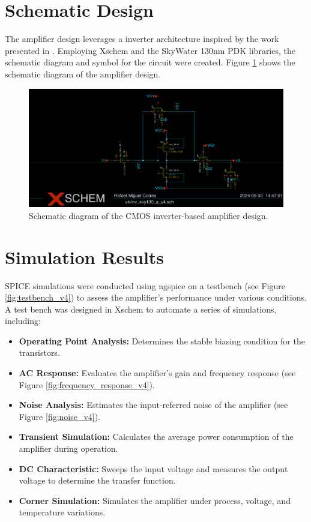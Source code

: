 \section{Schematic Design}
The amplifier design leverages a inverter architecture inspired by the work presented in \textcite{Yuan_Hierlemann_Frey_2021}.
Employing Xschem and the SkyWater 130nm PDK libraries, the schematic diagram and symbol for the circuit were created. 
Figure \ref{fig:schematic_v4} shows the schematic diagram of the amplifier design.

\begin{figure}[ht!]
\centering
\includegraphics[width=\textwidth]{Figures/v4_schematic.png}
\caption{Schematic diagram of the CMOS inverter-based amplifier design.}
\label{fig:schematic_v4}
\end{figure}

\section{Simulation Results}

SPICE simulations were conducted using ngspice on a testbench (see Figure \ref{fig:testbench_v4}) to assess the amplifier's performance under various conditions. 
A test bench was designed in Xschem to automate a series of simulations, including:

\begin{itemize}
\item \textbf{Operating Point Analysis:} Determines the stable biasing condition for the transistors.
\item \textbf{AC Response:} Evaluates the amplifier's gain and frequency response (see Figure \ref{fig:frequency_response_v4}).
\item \textbf{Noise Analysis:} Estimates the input-referred noise of the amplifier (see Figure \ref{fig:noise_v4}).
\item \textbf{Transient Simulation:} Calculates the average power consumption of the amplifier during operation.
\item \textbf{DC Characteristic:} Sweeps the input voltage and measures the output voltage to determine the transfer function.
\item \textbf{Corner Simulation:} Simulates the amplifier under process, voltage, and temperature variations.
\end{itemize}

